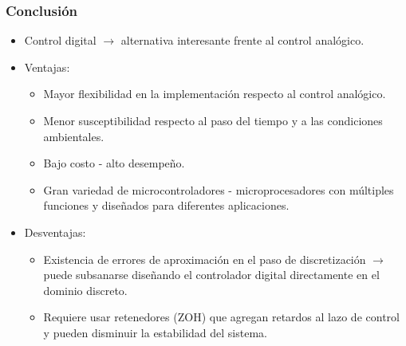 \documentclass[aspectratio=169,handout]{beamer}
\theoremstyle{definition}
\theoremstyle{plain}
\theoremstyle{remark}
\begin{document}
\begin{frame}[<+->]\frametitle{Conclusión}
	\begin{itemize}
		\item Control digital $\rightarrow$ alternativa interesante frente al control analógico.
		\item Ventajas:
		\begin{itemize}
			\item Mayor flexibilidad en la implementación respecto al control analógico.
			\item Menor susceptibilidad respecto al paso del tiempo y a las condiciones ambientales.
			\item Bajo costo - alto desempeño.
			\item Gran variedad de microcontroladores - microprocesadores con múltiples funciones y diseñados para diferentes aplicaciones.
		\end{itemize}
		\item Desventajas:
		\begin{itemize}
			\item Existencia de errores de aproximación en el paso de discretización $\rightarrow$ puede subsanarse diseñando el controlador digital directamente en el dominio discreto.
			\item Requiere usar retenedores (ZOH) que agregan retardos al lazo de control y pueden disminuir la estabilidad del sistema.
		\end{itemize}
	\end{itemize}
\end{frame}
 
\end{document}
